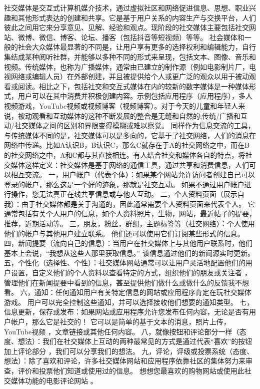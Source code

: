 社交媒体是交互式计算机媒介技术，通过虚拟社区和网络促进信息、思想、职业兴趣和其他形式表达的创建和共享。它是基于用户关系的内容生产与交换平台，人们彼此之间用它来分享意见、见解、经验和观点。现阶段的社交媒体主要包括社交网站、微博、微信、博客、论坛、播客（包括抖音等短视频）等等。
社会媒体和一般的社会大众媒体最显著的不同是，让用户享有更多的选择权利和编辑能力，自行集结成某种阅听社群，并能够以多种不同的形式来呈现，包括文本、图像、音乐和视频。传统媒体，也称为广播媒体，通常由已建立的制作源（例如电影制片厂，电视网络或编辑人员）在外部创建，并且被提供给个人或更广泛的观众以用于被动观看或阅读。相比之下，包括社交和交互式媒体在内的较新的数字媒体是一种媒体形式，用户可以在其中消费并积极创建内容。示例包括应用程序（应用程序），多人视频游戏，YouTube视频或视频博客（视频博客）。对于今天的儿童和年轻人来说，被动观看和互动媒体的这种不断发展的整合是无缝和自然的;传统/广播和互动/社交媒体之间的区别和界限变得模糊或难以察觉。
同样作为信息交流的工具，与传统媒体不同的是，社交媒体可以是多向的，它基于了社交网络，人们的消息在网络中传递。比如A认识B，B认识C，那么C就存在于A的社交网络之中，而在B的社交网络之中，A和C都与其直接相连。有人结合社交和媒体各自的特点，将社交媒体这样定义：社交媒体是基于网络的通信工具，通过共享和消费信息，人们可以相互交流。
一，用户帐户（代表个体）：如果某个网站允许访问者创建自己可以登录的帐户，那么这是一个好的迹象，那就是社交互动。 如果不通过用户帐户进行操作，您无法真正在线共享信息或与他人互动。
二，个人资料页面（展示自我）：由于社交媒体都是关于沟通的，因此通常需要个人资料页面来代表个人。 它通常包括有关个人用户的信息，如个人资料照片，生物，网站，最近帖子的提要，推荐，近期活动等。
三，朋友，粉丝，群组，主题标签等（社交网络）：个人使用他们的帐户与其他用户建立联系。 他们还可以使用它们订阅某些形式的信息。
四，新闻提要（流向自己的信息）：当用户在社交媒体上与其他用户联系时，他们基本上会说，“我想从这些人那里获取信息。” 该信息通过他们的新闻源实时更新。
五，个性化（选择性、个性）：社交媒体网站通常可以让用户灵活地配置他们的用户设置，自定义他们的个人资料以查看特定的方式，组织他们的朋友或关注者 ，管理他们在新闻提要中看到的信息，甚至提供他们做什么或做什么的反馈我不想看。
六，通知：任何通知用户有关特定信息的网站或应用程序肯定在玩社交媒体游戏。 用户可以完全控制这些通知，并可以选择接收他们想要的通知类型。
七，信息更新，保存或发布：如果网站或应用程序允许您发布任何内容，无论是否有用户帐户，那么它是社交的！ 它可以是简单的基于文本的消息，照片上传， YouTube视频 ，文章链接或其他任何内容。
八，就像按钮和评论部分一样（态度、想法）：我们在社交媒体上互动的两种最常见的方式是通过代表“喜欢”的按钮加上评论部分 ，我们可以分享我们的想法。
九，评论，评级或投票系统（态度、想法）：除了喜欢和评论，许多社交媒体网站和应用程序依靠社区的集体努力来审查，评价和投票他们知道或使用过的信息。 想想您最喜欢的购物网站或使用此社交媒体功能的电影评论网站 。

